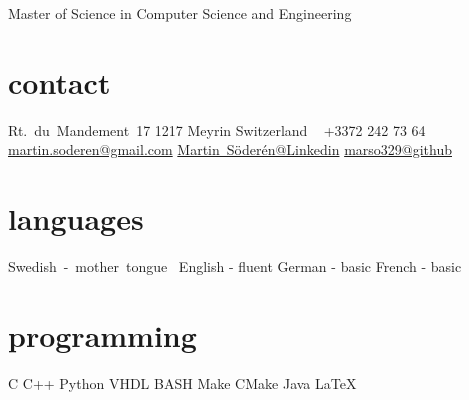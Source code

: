 \documentclass[]{cv-style}          %
\begin{document}
       {Master of Science in Computer Science and Engineering}        %


\begin{aside}
%
\section{contact}
Rt.~du~Mandement~17
1217 Meyrin
Switzerland
~
+3372 242 73 64
    ~
    \href{mailto:martin.soderen@gamil.com}{martin.soderen@gmail.com}
    \href{https://se.linkedin.com/in/martin-s%C3%B6der%C3%A9n-272002a7}{\mbox{Martin Söderén@Linkedin}}
        \href{https://github.com/marso329}{\mbox{marso329@github}}
\section{languages}
    \mbox{Swedish - mother tongue  }
    English - fluent
    German - basic  
    French - basic
\section{programming}
C 
C++ 
Python   
VHDL          
BASH            
Make               
CMake          
Java      
\LaTeX{} 
% 
\end{aside}

\end{document}

